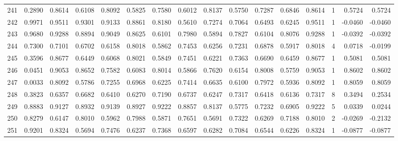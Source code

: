 \begin{tabular}{lrrrrrrrrrrrrrrr}
241 &      0.2890 &  0.8614 &  0.6108 &  0.8092 &  0.5825 &  0.7580 &  0.6012 &  0.8137 &  0.5750 &  0.7287 &   0.6846 &     0.8614 &      1 &                    0.5724 &                     0.5724 \\
242 &      0.9971 &  0.9511 &  0.9301 &  0.9133 &  0.8861 &  0.8180 &  0.5610 &  0.7274 &  0.7064 &  0.6493 &   0.6245 &     0.9511 &      1 &                   -0.0460 &                    -0.0460 \\
243 &      0.9680 &  0.9288 &  0.8894 &  0.9049 &  0.8625 &  0.6101 &  0.7980 &  0.5894 &  0.7827 &  0.6104 &   0.8076 &     0.9288 &      1 &                   -0.0392 &                    -0.0392 \\
244 &      0.7300 &  0.7101 &  0.6702 &  0.6158 &  0.8018 &  0.5862 &  0.7453 &  0.6256 &  0.7231 &  0.6878 &   0.5917 &     0.8018 &      4 &                    0.0718 &                    -0.0199 \\
245 &      0.3596 &  0.8677 &  0.6449 &  0.6068 &  0.8021 &  0.5849 &  0.7451 &  0.6221 &  0.7363 &  0.6690 &   0.6459 &     0.8677 &      1 &                    0.5081 &                     0.5081 \\
246 &      0.0451 &  0.9053 &  0.8652 &  0.7582 &  0.6083 &  0.8014 &  0.5866 &  0.7620 &  0.6154 &  0.8008 &   0.5759 &     0.9053 &      1 &                    0.8602 &                     0.8602 \\
247 &      0.0033 &  0.8092 &  0.5786 &  0.7255 &  0.6968 &  0.6225 &  0.7414 &  0.6635 &  0.6100 &  0.7972 &   0.5936 &     0.8092 &      1 &                    0.8059 &                     0.8059 \\
248 &      0.3823 &  0.6357 &  0.6682 &  0.6410 &  0.6270 &  0.7190 &  0.6737 &  0.6247 &  0.7317 &  0.6418 &   0.6136 &     0.7317 &      8 &                    0.3494 &                     0.2534 \\
249 &      0.8883 &  0.9127 &  0.8932 &  0.9139 &  0.8927 &  0.9222 &  0.8857 &  0.8137 &  0.5775 &  0.7232 &   0.6905 &     0.9222 &      5 &                    0.0339 &                     0.0244 \\
250 &      0.8279 &  0.6147 &  0.8010 &  0.5962 &  0.7988 &  0.5871 &  0.7651 &  0.5691 &  0.7322 &  0.6269 &   0.7188 &     0.8010 &      2 &                   -0.0269 &                    -0.2132 \\
251 &      0.9201 &  0.8324 &  0.5694 &  0.7476 &  0.6237 &  0.7368 &  0.6597 &  0.6282 &  0.7084 &  0.6544 &   0.6226 &     0.8324 &      1 &                   -0.0877 &                    -0.0877 \\

\end{tabular}
